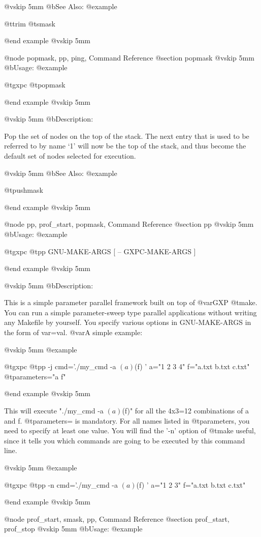 @vskip 5mm
@b{See Also:}
@example

  @t{trim} @t{smask}

@end example
@vskip 5mm

@node popmask, pp, ping, Command Reference
@section popmask
@vskip 5mm
@b{Usage:}
@example

  @t{gxpc} @t{popmask}

@end example
@vskip 5mm

@vskip 5mm
@b{Description:}


  Pop the set of nodes on the top of the stack. The next entry
that is used to be referred to by name `1' will now be the top
of the stack, and thus become the default set of nodes selected
for execution.

@vskip 5mm
@b{See Also:}
@example

  @t{pushmask}

@end example
@vskip 5mm

@node pp, prof_start, popmask, Command Reference
@section pp
@vskip 5mm
@b{Usage:}
@example

  @t{gxpc} @t{pp} GNU-MAKE-ARGS [ -- GXPC-MAKE-ARGS ]

@end example
@vskip 5mm

@vskip 5mm
@b{Description:}


  This is a simple parameter parallel framework built on top of @var{GXP} @t{make}.
You can run a simple parameter-sweep type parallel applications without 
writing any Makefile by yourself.  You specify various options in GNU-MAKE-ARGS 
in the form of var=val.  @var{A} simple example:

@vskip 5mm
@example

  @t{gxpc} @t{pp} -j cmd='./my_cmd -a $(a) $(f) ' a="1 2 3 4" f="a.txt b.txt c.txt" @t{parameters}="a f"

@end example
@vskip 5mm

This will execute "./my_cmd -a $(a) $(f)" for all the 4x3=12 combinations
of a and f. @t{parameters}= is mandatory.  For all names listed in @t{parameters},
you need to specify at least one value.  You will find the '-n' option of 
@t{make} useful, since it tells you which commands are going to be executed by 
this command line.

@vskip 5mm
@example

  @t{gxpc} @t{pp} -n cmd='./my_cmd -a $(a) $(f) ' a="1 2 3" f="a.txt b.txt c.txt"

@end example
@vskip 5mm


@node prof_start, smask, pp, Command Reference
@section prof_start, prof_stop
@vskip 5mm
@b{Usage:}
@example

